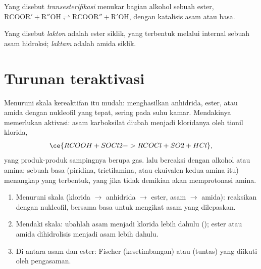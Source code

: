 \begin{definition}[Transesterifikasi]\label{def:b2:acyl-substitution:transesterification}
Yang disebut \emph{transesterifikasi} menukar
bagian alkohol sebuah ester,
$\mathrm{RCOOR' + R''OH \rightleftharpoons RCOOR'' + R'OH}$, dengan katalisis asam atau basa.
\end{definition}

\begin{definition}\label{def:b2:acyl-substitution:lactone}
Yang disebut \emph{lakton} adalah ester siklik, yang terbentuk
melalui  internal sebuah asam hidroksi; \emph{laktam}
adalah amida siklik.
\end{definition}

\section{Turunan teraktivasi}

Menuruni skala kereaktifan itu mudah:  menghasilkan anhidrida,
ester, atau amida dengan nukleofil yang tepat, sering pada suhu kamar.
Mendakinya memerlukan aktivasi: asam karboksilat diubah menjadi kloridanya
oleh tionil klorida,
\[
  \ce{RCOOH + SOCl2 -> RCOCl + SO2 + HCl} ,
\]
yang produk-produk sampingnya berupa gas.  lalu bereaksi dengan
alkohol atau amina; sebuah basa (piridina, trietilamina, atau ekuivalen
kedua amina itu) menangkap  yang terbentuk, yang jika tidak
demikian akan memprotonasi amina.

\begin{method}\label{met:b2:acyl-substitution:ladder}
\begin{enumerate}
  \item Menuruni skala (klorida $\to$ anhidrida $\to$ ester, asam $\to$ amida):
        reaksikan dengan nukleofil, bersama basa untuk mengikat asam yang
        dilepaskan.
  \item Mendaki skala: ubahlah asam menjadi klorida lebih dahulu
        (); ester atau amida dihidrolisis menjadi asam lebih dahulu.
  \item Di antara asam dan ester:  Fischer (kesetimbangan) atau
         (tuntas) yang diikuti oleh pengasaman.
\end{enumerate}
\end{method}

